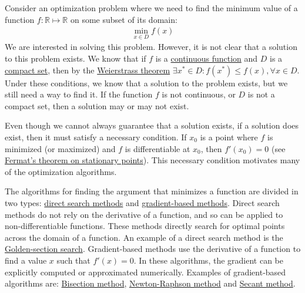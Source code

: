 \documentclass[12pt, a4paper]{article}
\begin{document}
Consider an optimization problem where we need to find the minimum value of a function \(f:\mathbb{R}\mapsto\mathbb{R}\) on some subset of its domain:
\begin{align*}
\min_{x\in D}{f(x)}
\end{align*}
We are interested in solving this problem.
However, it is not clear that a solution to this problem exists.
We know that if \(f\) is a \href{https://en.wikipedia.org/wiki/Continuous\_function}{continuous function} and \(D\) is a \href{https://en.wikipedia.org/wiki/Compact\_space}{compact set}, then by the \href{https://en.wikipedia.org/wiki/Extreme\_value\_theorem}{Weierstrass theorem} \(\exists x^*\in D:f(x^*)\leq f(x),\forall x\in D\).
Under these conditions, we know that a solution to the problem exists, but we still need a way to find it.
If the function \(f\) is not continuous, or \(D\) is not a compact set, then a solution may or may not exist.

Even though we cannot always guarantee that a solution exists, if a solution does exist, then it must satisfy a necessary condition.
If \(x_0\) is a point where \(f\) is minimized (or maximized) and \(f\) is differentiable at \(x_0\), then \(f'(x_0)=0\) (see \href{https://en.wikipedia.org/wiki/Fermat\%27s\_theorem\_(stationary\_points)}{Fermat's theorem on stationary points}).
This necessary condition motivates many of the optimization algorithms.

The algorithms for finding the argument that minimizes a function are divided in two types: \uline{direct search methods} and \uline{gradient-based methods}.
Direct search methods do not rely on the derivative of a function, and so can be applied to non-differentiable functions.
These methods directly search for optimal points across the domain of a function.
An example of a direct search method is the \href{https://en.wikipedia.org/wiki/Golden-section\_search}{Golden-section search}.
Gradient-based methods use the derivative of a function to find a value \(x\) such that \(f'(x)=0\).
In these algorithms, the gradient can be explicitly computed or approximated numerically.
Examples of gradient-based algorithms are: \href{https://en.wikipedia.org/wiki/Bisection\_method}{Bisection method}, \href{https://en.wikipedia.org/wiki/Newton's\_method}{Newton-Raphson method} and \href{https://en.wikipedia.org/wiki/Secant\_method}{Secant method}.
\end{document}
